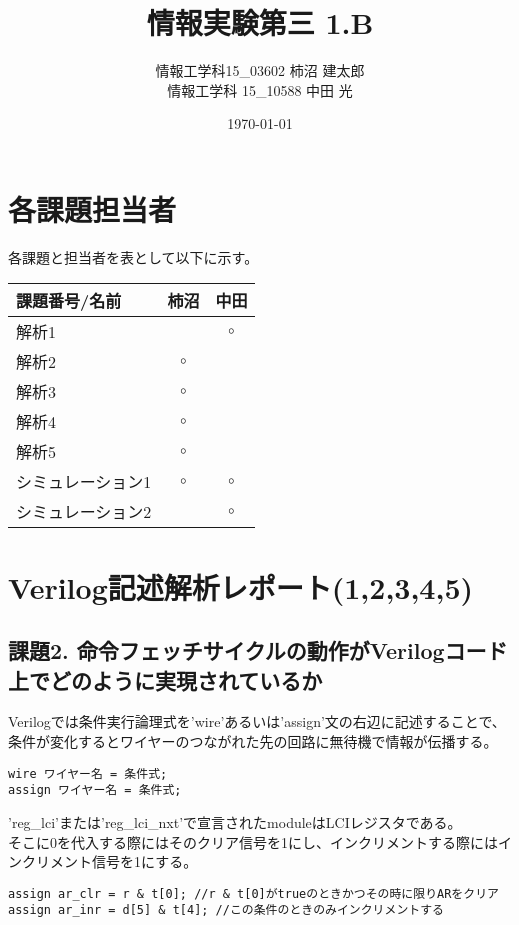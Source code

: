 \documentclass{jsarticle}
\title{情報実験第三 1.B}
\author{情報工学科15\_03602 柿沼 建太郎 \\ 情報工学科 15\_10588 中田 光}
\date{\today}
\begin{document}
\maketitle

\section*{各課題担当者}
各課題と担当者を表として以下に示す。
\begin{table}[h]
\begin{tabular}{|l|c|c|} \hline
課題番号/名前 & 柿沼 & 中田 \\ \hline \hline
解析1 &  & $\circ$ \\ \hline
解析2 & $\circ$ & \\ \hline
解析3 & $\circ$ & \\ \hline
解析4 & $\circ$ & \\ \hline
解析5 & $\circ$ & \\ \hline
シミュレーション1 & $\circ$ & $\circ$ \\ \hline
シミュレーション2 &  & $\circ$  \\ \hline
\end{tabular}
\end{table}

\section*{Verilog記述解析レポート(1,2,3,4,5)}

\subsection*{課題2. 命令フェッチサイクルの動作がVerilogコード上でどのように実現されているか}

Verilogでは条件実行論理式を'wire'あるいは'assign'文の右辺に記述することで、条件が変化するとワイヤーのつながれた先の回路に無待機で情報が伝播する。

\begin{lstlisting}[]
wire ワイヤー名 = 条件式;
assign ワイヤー名 = 条件式;
\end{lstlisting}
'reg\_lci'または'reg\_lci\_nxt'で宣言されたmoduleはLCIレジスタである。\\
そこに0を代入する際にはそのクリア信号を1にし、インクリメントする際にはインクリメント信号を1にする。

\begin{lstlisting}[caption=ARの場合]
assign ar_clr = r & t[0]; //r & t[0]がtrueのときかつその時に限りARをクリア
assign ar_inr = d[5] & t[4]; //この条件のときのみインクリメントする
\end{lstlisting}
\end{document}
